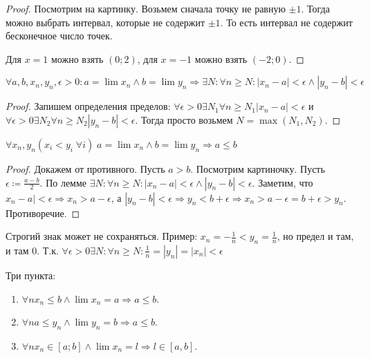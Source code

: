 \begin{proof}
    Посмотрим на картинку. Возьмем сначала точку не равную $\pm 1$. Тогда можно выбрать интервал, которые не содержит $\pm 1$. То есть интервал не содержит бесконечное число точек.

    Для $x=1$ можно взять  $(0;2)$, для  $x=-1$ можно взять  $(-2;0)$.
\end{proof}
\begin{lemma}
    $\forall a, b, x_n, y_n, \epsilon > 0: a = \lim x_n \land b = \lim y_n \Rightarrow \exists N: \forall n \ge N: |x_n-a| < \epsilon \land |y_n-b| < \epsilon$ 
\end{lemma}
\begin{proof}
    Запишем определения пределов: $\forall \epsilon > 0 \exists N_1 \forall n \ge N_1 |x_n-a| < \epsilon$ и $\forall \epsilon > 0 \exists N_2 \forall n \ge N_2 |y_n-b| < \epsilon$. Тогда просто возьмем $N=\max(N_1, N_2)$.
\end{proof}
\begin{theorem}
    $\forall x_n, y_n (x_i < y_i \; \forall i)\; a = \lim x_n \land b = \lim y_n \Rightarrow a \le b$
\end{theorem}
\begin{proof}
    Докажем от противного. Пусть $a>b$. Посмотрим картиночку. Пусть $\epsilon \coloneqq \frac{a-b}{2}$. По лемме $\exists N: \forall n \ge N: |x_n-a|<\epsilon \land |y_n-b|<\epsilon$. Заметим, что $x_n-a| < \epsilon \Rightarrow x_n > a - \epsilon$, а $|y_n-b|<\epsilon \Rightarrow y_n < b + \epsilon \Rightarrow x_n > a - \epsilon = b + \epsilon > y_n$. Противоречие.
\end{proof}
\begin{remark}
    Строгий знак может не сохраняться. Пример: $x_n = -\frac{1}{n} < y_n = \frac{1}{n}$, но предел и там, и там 0. Т.к. $\forall \epsilon > 0 \exists N: \forall n \ge N: \frac{1}{n} = |y_n| = |x_n| < \epsilon$ 
\end{remark}
\begin{consequence}
   Три пункта:
   \begin{enumerate}
       \item $\forall n x_n \le b \land \lim x_n = a \Rightarrow a \le b$.
       \item $\forall n a \le y_n \land \lim y_n = b \Rightarrow a \le b$.
       \item $\forall n x_n \in [a;b] \land \lim x_n = l \Rightarrow l \in [a, b]$.
   \end{enumerate}
\end{consequence}
